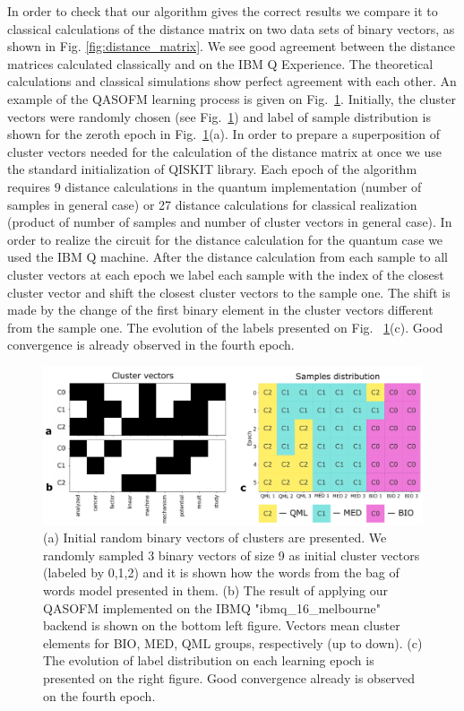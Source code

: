 \documentclass[pra,showkeys,twocolumn,showpacs]{revtex4-1}
\begin{document}
In order to check that our algorithm gives the correct results we compare it to classical calculations of the distance matrix on two data sets of binary vectors, 
as shown in Fig. \ref{fig:distance_matrix}.  
We see good agreement between the distance matrices calculated classically and on the IBM Q Experience. 
The theoretical calculations and classical simulations show perfect agreement with each other. 
An example of the QASOFM learning process is given on Fig.~\ref{fig:convergence}. 
Initially, the cluster vectors were randomly chosen (see Fig.~\ref{fig:convergence}) and 
label of sample distribution is shown for the zeroth epoch in Fig.~\ref{fig:convergence}(a). 
In order to prepare a superposition of cluster vectors needed for the calculation of the distance matrix at once we use the standard initialization of QISKIT library. 
Each epoch of the algorithm requires 9 distance calculations in the  quantum implementation (number of samples in general case) or 
27 distance calculations for classical realization (product of number of samples and number of cluster vectors in general case). 
In order to realize the circuit for the distance calculation for the quantum case we used the IBM Q machine. 
After the distance calculation from each sample to all cluster vectors at each epoch we label each sample with the index of the closest cluster vector 
and shift the closest cluster vectors to the sample one. 
The shift is made by the change of the first binary element in the cluster vectors different from the sample one. 
The evolution of the labels presented on Fig. ~\ref{fig:convergence}(c).  
Good convergence is already observed in the fourth epoch.


\begin{figure}[t]
	\label{fig:convergence}
	\includegraphics[width=0.95\columnwidth]{convergence.png}
	\caption{
		(a) Initial random binary vectors of clusters are presented. 
		We randomly sampled 3 binary vectors of size 9 as initial cluster vectors (labeled by 0,1,2) and it is shown how the words from the bag of words model presented in them. 
		(b) The result of applying our QASOFM implemented on the IBMQ "ibmq\_16\_melbourne" backend is shown on the bottom left figure. 
		Vectors mean cluster elements for BIO, MED, QML groups, respectively (up to down). 
		(c) The evolution of label distribution on each learning epoch is presented on the right figure. 
		Good convergence already is observed on the fourth epoch.
	} 
\end{figure}
\end{document}

